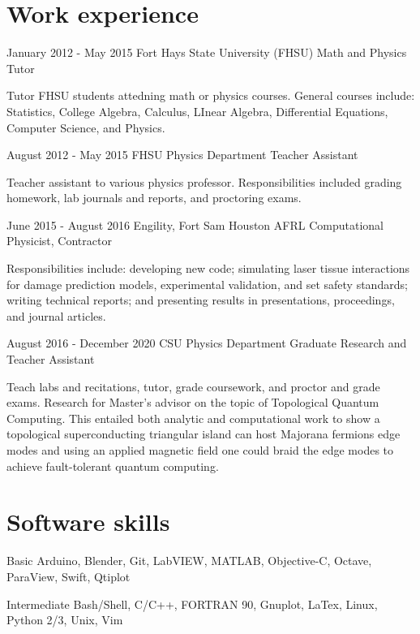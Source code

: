 \documentclass[11pt]{tccv}
\begin{document}
\section{Work experience}

\begin{eventlist}

\item{January 2012 - May 2015}
	 {Fort Hays State University (FHSU)}
	 {Math and Physics Tutor}

Tutor FHSU students attedning math or physics courses. General courses include: Statistics, College Algebra, Calculus, LInear Algebra, Differential Equations, Computer Science, and Physics.

\item{August 2012 - May 2015}
	 {FHSU Physics Department}
	 {Teacher Assistant}

Teacher assistant to various physics professor. Responsibilities included grading homework, lab journals and reports, and proctoring exams.

\item{June 2015 - August 2016}
	 {Engility, Fort Sam Houston AFRL}
	 {Computational Physicist, Contractor}

Responsibilities include: developing new code; simulating laser tissue interactions for damage prediction models, experimental validation, and set safety standards; writing technical reports; and presenting results in presentations, proceedings, and journal articles.

\pagebreak

\item{August 2016 - December 2020}
  {CSU Physics Department}
  {Graduate Research and Teacher Assistant}

  Teach labs and recitations, tutor, grade coursework, and proctor and grade exams. Research for Master's advisor on the topic of Topological Quantum Computing. This entailed both analytic and computational work to show a topological superconducting triangular island can host Majorana fermions edge modes and using an applied magnetic field one could braid the edge modes to achieve fault-tolerant quantum computing.

\end{eventlist}


\section{Software skills}

\begin{factlist}

  \item{Basic}
    {Arduino, Blender, Git, LabVIEW, MATLAB, Objective-C, Octave, ParaView, Swift, Qtiplot}


  \item{Intermediate}
    {Bash/Shell, C/C++, FORTRAN 90, Gnuplot, LaTex, Linux, Python 2/3, Unix, Vim}

\end{factlist}
\end{document}
